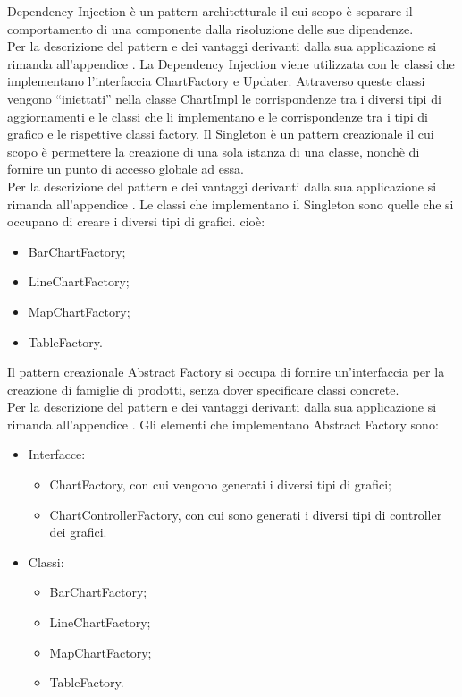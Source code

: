 	Dependency Injection è un pattern architetturale il cui scopo è separare il comportamento di una componente dalla risoluzione delle sue dipendenze.\\
	Per la descrizione del pattern e dei vantaggi derivanti dalla sua applicazione si rimanda all'appendice .
	La Dependency Injection viene utilizzata con le classi che implementano l'interfaccia ChartFactory e Updater. Attraverso queste classi vengono “iniettati” nella classe ChartImpl le corrispondenze tra i diversi tipi di aggiornamenti e le classi che li implementano e le corrispondenze tra i tipi di grafico e le rispettive classi factory.
	Il Singleton è un pattern creazionale il cui scopo è permettere la creazione di una sola istanza di una classe, nonchè di fornire un punto di accesso globale ad essa.\\
	Per la descrizione del pattern e dei vantaggi derivanti dalla sua applicazione si rimanda all'appendice .
	Le classi che implementano il Singleton sono quelle che si occupano di creare i diversi tipi di grafici. cioè:
	\begin{itemize}
	\item BarChartFactory;
	\item LineChartFactory;
	\item MapChartFactory;
	\item TableFactory.
	\end{itemize}
	Il pattern creazionale Abstract Factory si occupa di fornire un'interfaccia per la creazione di famiglie di prodotti, senza dover specificare classi concrete. \\
	Per la descrizione del pattern e dei vantaggi derivanti dalla sua applicazione si rimanda all'appendice .
	Gli elementi che implementano Abstract Factory sono:
	\begin{itemize}
	\item Interfacce:
		\begin{itemize}
			\item ChartFactory, con cui vengono generati i diversi tipi di grafici;
			\item ChartControllerFactory, con cui sono generati i diversi tipi di controller dei grafici.
		\end{itemize}
	\item Classi:
		\begin{itemize}
			\item BarChartFactory;
			\item LineChartFactory;
			\item MapChartFactory;
			\item TableFactory.
		\end{itemize}
	\end{itemize}

